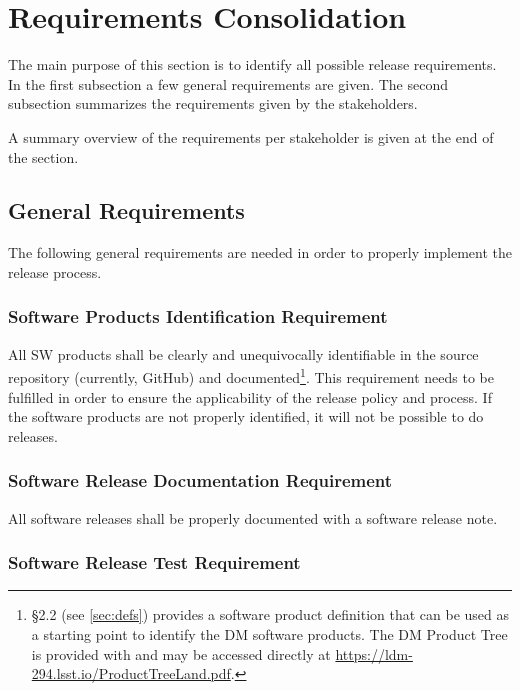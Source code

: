 \newpage
\section{Requirements Consolidation} \label{sec:reqdef}

The main purpose of this section is to identify all possible release requirements.
In the first subsection a few general requirements are given.
The second subsection summarizes the requirements given by the stakeholders.

A summary overview of the requirements per stakeholder is given at the end of the section.


\subsection{General Requirements} \label{sec:genreq}

The following general requirements are needed in order to properly implement the release process.


\subsubsection{Software Products Identification Requirement} \label{sec:swid}

All \gls{SW} products shall be clearly and unequivocally identifiable in the source repository (currently, GitHub) and documented\footnote{
 \S2.2 (see \ref{sec:defs}) provides a software product definition that can be used as a starting point to identify the DM software products.
The DM Product Tree is provided with  and may be accessed directly at \url{https://ldm-294.lsst.io/ProductTreeLand.pdf}.}.
This requirement needs to be fulfilled in order to ensure the applicability of the release policy and process.
If the software products are not properly identified, it will not be possible to do releases.


\subsubsection{Software Release Documentation Requirement} \label{sec:reqdoc}

All software releases shall be properly documented with a software release note.


\subsubsection{Software Release Test Requirement} \label{sec:test}

